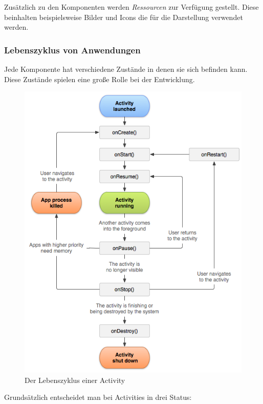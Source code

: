 Zusätzlich zu den Komponenten werden \emph{Ressourcen} zur Verfügung gestellt. Diese beinhalten beispielsweise Bilder und Icons die für die Darstellung verwendet werden.

\subsubsection{Lebenszyklus von Anwendungen}

Jede Komponente hat verschiedene Zustände in denen sie sich befinden kann. Diese Zustände spielen eine große Rolle bei der Entwicklung. 

\begin{figure}[ht!]
\begin{center}
\includegraphics[scale=.6]{images/activity_lifecycle}
\caption{Der Lebenszyklus einer Activity}
\label{lifecycle}
\end{center}
\end{figure}

Grundsätzlich entscheidet man bei Activities in drei Status:

